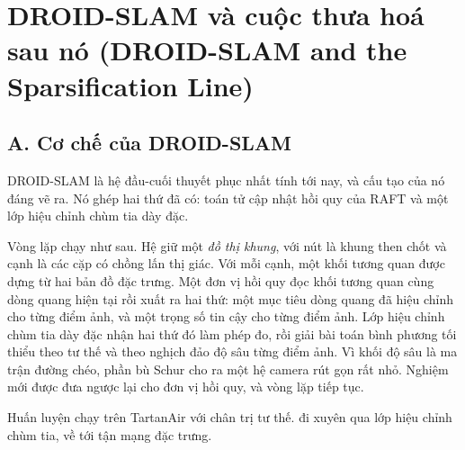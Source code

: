 \documentclass[../../deep_learning.tex]{subfiles}
\begin{document}
\section{DROID-SLAM và cuộc thưa hoá sau nó (DROID-SLAM and the Sparsification Line)}

\subsection{A. Cơ chế của DROID-SLAM}
DROID-SLAM \cite{teed2021droid} là hệ đầu-cuối thuyết phục nhất tính tới nay, và cấu tạo của nó đáng vẽ ra. Nó ghép hai thứ đã có: toán tử cập nhật hồi quy của RAFT \cite{teed2020raft} và một lớp hiệu chỉnh chùm tia dày đặc.

Vòng lặp chạy như sau. Hệ giữ một \emph{đồ thị khung}, với nút là khung then chốt và cạnh là các cặp có chồng lấn thị giác. Với mỗi cạnh, một khối tương quan được dựng từ hai bản đồ đặc trưng. Một đơn vị hồi quy đọc khối tương quan cùng dòng quang hiện tại rồi xuất ra hai thứ: một mục tiêu dòng quang đã hiệu chỉnh cho từng điểm ảnh, và một trọng số tin cậy cho từng điểm ảnh. Lớp hiệu chỉnh chùm tia dày đặc nhận hai thứ đó làm phép đo, rồi giải bài toán bình phương tối thiểu theo tư thế và theo nghịch đảo độ sâu từng điểm ảnh. Vì khối độ sâu là ma trận đường chéo, phần bù Schur cho ra một hệ camera rút gọn rất nhỏ. Nghiệm mới được đưa ngược lại cho đơn vị hồi quy, và vòng lặp tiếp tục.

Huấn luyện chạy trên TartanAir \cite{wang2020tartanair} với chân trị tư thế.  đi xuyên qua lớp hiệu chỉnh chùm tia, về tới tận mạng đặc trưng.
\end{document}
